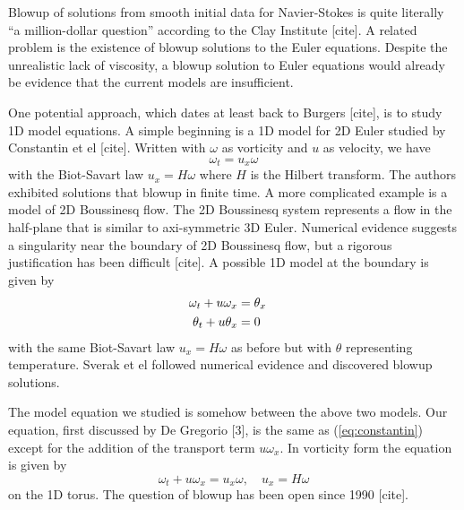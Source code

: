 \documentclass[12pt]{article}
\begin{document}



Blowup of solutions from smooth initial data for Navier-Stokes is quite literally ``a million-dollar question'' according to the Clay Institute [cite]. A related problem is the existence of blowup solutions to the Euler equations. Despite the unrealistic lack of viscosity, a blowup solution to Euler equations would already be evidence that the current models are insufficient.

One potential approach, which dates at least back to Burgers [cite], is to study 1D model equations. A simple beginning is a 1D model for 2D Euler studied by Constantin et el [cite]. Written with $\omega$ as vorticity and $u$ as velocity, we have
\begin{equation}
	\omega_t = u_x \omega
	\label{eq:constantin}
\end{equation}
with the Biot-Savart law $u_x = H \omega$ where $H$ is the Hilbert transform. The authors exhibited solutions that blowup in finite time. A more complicated example is a model of 2D Boussinesq flow. The 2D Boussinesq system represents a flow in the half-plane that is similar to axi-symmetric 3D Euler. Numerical evidence suggests a singularity near the boundary of 2D Boussinesq flow, but a rigorous justification has been difficult [cite]. A possible 1D model at the boundary is given by 
\begin{equation}
	\begin{aligned}
		\omega_t + u \omega_x &= \theta_x \cr
		\theta_t + u \theta_x &= 0
	\end{aligned}
	\label{eq:boussinisq_system}
\end{equation}
with the same Biot-Savart law $u_x = H \omega$ as before but with $\theta$ representing temperature. Sverak et el followed numerical evidence and discovered blowup solutions. 

The model equation we studied is somehow between the above two models. Our equation, first discussed by De Gregorio [3], is the same as (\ref{eq:constantin}) except for the addition of the transport term $u \omega_x$. In vorticity form the equation is given by 
\begin{equation}
	\omega_t + u \omega_x = u_x \omega, \quad u_x = H \omega
	\label{eq:degregorio}
\end{equation}
on the 1D torus. The question of blowup has been open since 1990 [cite]. 
\end{document}
